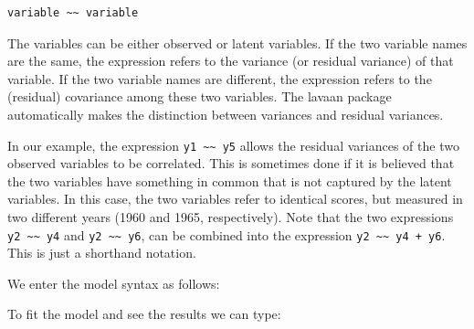 \begin{verbatim}
variable ~~ variable
\end{verbatim}

The variables can be either observed or latent variables. If the two
variable names are the same, the expression refers to the variance (or
residual variance) of that variable. If the two variable names are
different, the expression refers to the (residual) covariance among
these two variables. The lavaan package automatically makes the
distinction between variances and residual variances.

In our example, the expression
\texttt{y1\ \textasciitilde{}\textasciitilde{}\ y5} allows the residual
variances of the two observed variables to be correlated. This is
sometimes done if it is believed that the two variables have something
in common that is not captured by the latent variables. In this case,
the two variables refer to identical scores, but measured in two
different years (1960 and 1965, respectively). Note that the two
expressions \texttt{y2\ \textasciitilde{}\textasciitilde{}\ y4} and
\texttt{y2\ \textasciitilde{}\textasciitilde{}\ y6}, can be combined
into the expression
\texttt{y2\ \textasciitilde{}\textasciitilde{}~y4\ +\ y6}. This is just
a shorthand notation.

We enter the model syntax as follows:

\begin{Shaded}
\begin{Highlighting}[]
\end{Highlighting}
\end{Shaded}

To fit the model and see the results we can type:

\begin{Shaded}
\begin{Highlighting}[]
\StringTok{ }
\NormalTok{)}
\end{Highlighting}
\end{Shaded}


